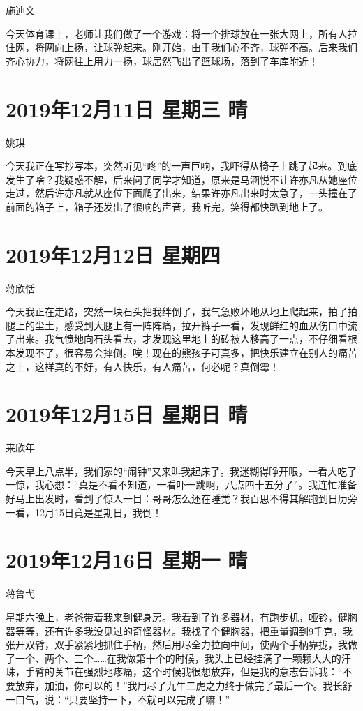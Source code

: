 施迪文

今天体育课上，老师让我们做了一个游戏：将一个排球放在一张大网上，所有人拉住网，将网向上扬，让球弹起来。刚开始，由于我们心不齐，球弹不高。后来我们齐心协力，将网往上用力一扬，球居然飞出了篮球场，落到了车库附近！

\section{2019年12月11日 星期三 晴}

姚琪

今天我正在写抄写本，突然听见``咚''的一声巨响，我吓得从椅子上跳了起来。到底发生了啥？我疑惑不解，后来问了同学才知道，原来是马涵悦不让许亦凡从她座位走过，然后许亦凡就从座位下面爬了出来，结果许亦凡出来时太急了，一头撞在了前面的箱子上，箱子还发出了很响的声音，我听完，笑得都快趴到地上了。

\section{2019年12月12日 星期四}

蒋欣恬

今天我正在走路，突然一块石头把我绊倒了，我气急败坏地从地上爬起来，拍了拍腿上的尘土，感受到大腿上有一阵阵痛，拉开裤子一看，发现鲜红的血从伤口中流了出来。我气愤地向石头看去，才发现这里地上的砖被人移高了一点，不仔细看根本发现不了，很容易会摔倒。唉！现在的熊孩子可真多，把快乐建立在别人的痛苦之上，这样真的不好，有人快乐，有人痛苦，何必呢？真倒霉！

\section{2019年12月15日 星期日 晴}

来欣年

今天早上八点半，我们家的``闹钟''又来叫我起床了。我迷糊得睁开眼，一看大吃了一惊，我心想：``真是不看不知道，一看吓一跳啊，八点四十五分了''。我连忙准备好马上出发时，看到了惊人一目：哥哥怎么还在睡觉？我百思不得其解跑到日历旁一看，12月15日竟是星期日，我倒！

\section{2019年12月16日 星期一 晴}

蒋鲁弋

星期六晚上，老爸带着我来到健身房。我看到了许多器材，有跑步机，哑铃，健胸器等等，还有许多我没见过的奇怪器材。我找了个健胸器，把重量调到9千克，我张开双臂，双手紧紧地抓住手柄，然后用尽全力拉向中间，使两个手柄靠拢，我做了一个、两个、三个\ldots\ldots 在我做第十个的时候，我头上已经挂满了一颗颗大大的汗珠，手臂的关节在强烈地疼痛，这个时候我很想放弃，但是我的意志告诉我：``不要放弃，加油，你可以的！''我用尽了九牛二虎之力终于做完了最后一个。我长舒一口气，说：``只要坚持一下，不就可以完成了嘛！''

